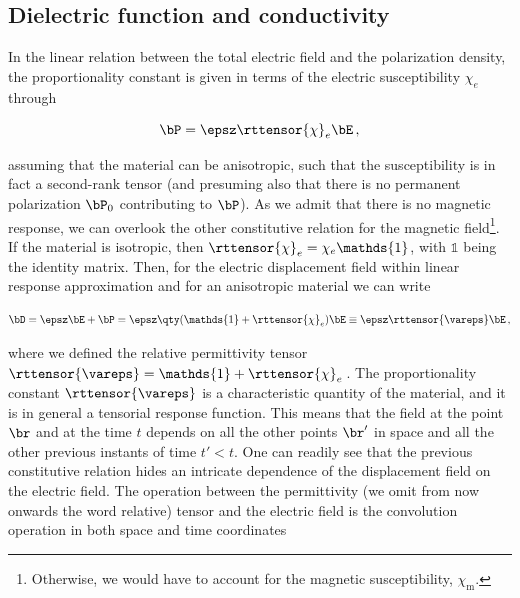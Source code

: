 \subsection{Dielectric function and conductivity}
\label{subsec:constitutive_relations_linear_response}

In the linear relation between the total electric field and the polarization density, the proportionality constant is given in terms of the electric susceptibility $\chi_e$ through

\begin{equation}
    \label{eq:polarization_density}
    \bP = \epsz \rttensor{\chi}_{e} \bE \,,
\end{equation}

\noindent assuming that the material can be anisotropic, such that the susceptibility is in fact a second-rank tensor (and presuming also that there is no permanent polarization $\bP_0$ contributing to $\bP$).
As we admit that there is no magnetic response, we can overlook the other constitutive relation for the magnetic field\footnote{Otherwise, we would have to account for the magnetic susceptibility, $\chi_\mathrm{m}$.}.
If the material is isotropic, then $\rttensor{\chi}_{e} = \chi_{e} \mathds{1}$, with $\mathds{1}$ being the identity matrix.
Then, for the electric displacement field within linear response approximation and for an anisotropic material we can write

\begin{equation}
    \label{eq:displacement_field}
    \bD = \epsz \bE + \bP = \epsz \qty(\mathds{1} + \rttensor{\chi}_{e}) \bE \equiv \epsz \rttensor{\vareps} \bE\,,
\end{equation}

\noindent where we defined the relative permittivity tensor $\rttensor{\vareps} = \mathds{1} + \rttensor{\chi}_{e}$\,.
The proportionality constant $\rttensor{\vareps}$ is a characteristic quantity of the material, and it is in general a tensorial response function.
This means that the field at the point $\br$ and at the time $t$  depends on all the other points $\br'$ in space and all the other previous instants of time $t'<t$.
One can readily see that the previous constitutive relation hides an intricate dependence of the displacement field on the electric field.
The operation between the permittivity (we omit from now onwards the word relative) tensor and the electric field is the convolution operation in both space and time coordinates

